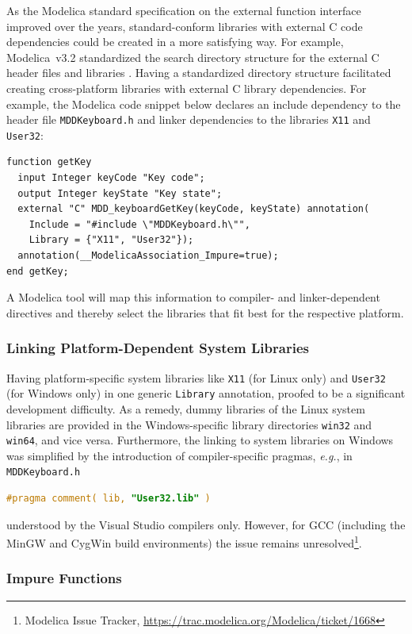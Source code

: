 \documentclass{resources/modelica}
\newcommand{\modelica}[1]{\lstinline[language=modelica]|#1|}
\begin{document}
As the Modelica standard specification on the external function interface improved over the years,
standard-conform libraries with external C code dependencies could
be created in a more satisfying way. For example, Modelica~v3.2
standardized the search directory structure for the external C header files and
libraries \citep[p.\@~153]{ModelicaAssociation2010}.
Having a standardized directory structure facilitated creating cross-platform libraries with external C library
dependencies. For example, the Modelica code snippet below declares an
include dependency to the header file \modelica{MDDKeyboard.h} and linker dependencies to the libraries
\modelica{X11} and \modelica{User32}:
\begin{lstlisting}[language=modelica]
function getKey
  input Integer keyCode "Key code";
  output Integer keyState "Key state";
  external "C" MDD_keyboardGetKey(keyCode, keyState) annotation(
    Include = "#include \"MDDKeyboard.h\"",
    Library = {"X11", "User32"});
  annotation(__ModelicaAssociation_Impure=true);
end getKey;
\end{lstlisting}
A Modelica tool will map this information to compiler- and linker-dependent
directives and thereby select the libraries that fit best for the respective
platform.

\subsubsection{Linking Platform-Dependent System Libraries}

Having platform-specific system libraries like \modelica{X11} (for Linux only) and \modelica{User32} (for Windows only) in one generic \modelica{Library} annotation, proofed to be a significant development difficulty. As a remedy, dummy libraries of the Linux system libraries are provided in the Windows-specific library directories \modelica{win32} and \modelica{win64}, and vice versa. Furthermore, the linking to system libraries on Windows was simplified by the introduction of compiler-specific pragmas, \textit{e.g.}, in \modelica{MDDKeyboard.h}
\begin{lstlisting}[language=C]
#pragma comment( lib, "User32.lib" )
\end{lstlisting}
understood by the Visual Studio compilers only. However, for GCC (including the MinGW and CygWin build environments) the issue remains unresolved\footnote{\label{T1668}Modelica Issue Tracker, \url{https://trac.modelica.org/Modelica/ticket/1668}}.

\subsubsection{Impure Functions}
\end{document}

